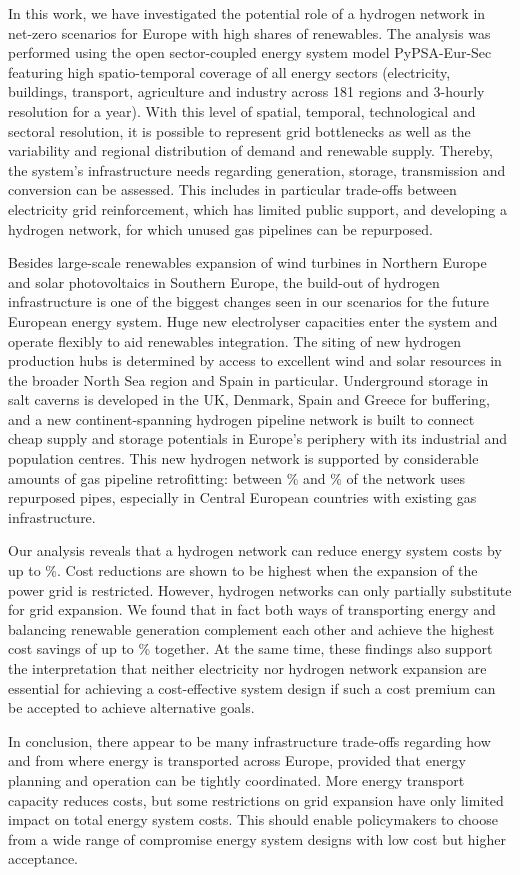In this work, we have investigated the potential role of a hydrogen network in
net-zero \co scenarios for Europe with high shares of renewables. The analysis
was performed using the open sector-coupled energy system model PyPSA-Eur-Sec
featuring high spatio-temporal coverage of all energy sectors (electricity,
buildings, transport, agriculture and industry across 181 regions and 3-hourly
resolution for a year). With this level of spatial, temporal, technological and
sectoral resolution, it is possible to represent grid bottlenecks as well as the
variability and regional distribution of demand and renewable supply. Thereby,
the system's infrastructure needs regarding generation, storage, transmission
and conversion can be assessed. This includes in particular trade-offs between
electricity grid reinforcement, which has limited public support, and developing
a hydrogen network, for which unused gas pipelines can be
repurposed.

Besides large-scale renewables expansion of wind turbines in Northern Europe and
solar photovoltaics in Southern Europe, the build-out of hydrogen infrastructure
is one of the biggest changes seen in our scenarios for the future European
energy system. Huge new electrolyser capacities enter the system and operate
flexibly to aid renewables integration. The siting of new hydrogen production
hubs is determined by access to excellent wind and solar resources in the
broader North Sea region and Spain in particular. Underground storage in salt
caverns is developed in the UK, Denmark, Spain and Greece for buffering, and a
new continent-spanning hydrogen pipeline network is built to connect cheap
supply and storage potentials in Europe's periphery with its industrial and
population centres. This new hydrogen network is supported by considerable
amounts of gas pipeline retrofitting: between \minretroshare\% and
\maxretroshare\% of the network uses repurposed pipes, especially in Central
European countries with existing gas infrastructure.

Our analysis reveals that a hydrogen network can reduce energy system costs by
up to \maxhybenefitrel\%. Cost reductions are shown to be highest when the
expansion of the power grid is restricted. However, hydrogen networks can only
partially substitute for grid expansion. We found that in fact both ways of
transporting energy and balancing renewable generation complement each other and
achieve the highest cost savings of up to \gridbenefitrel\% together. At the
same time, these findings also support the interpretation that neither
electricity nor hydrogen network expansion are essential for achieving a
cost-effective system design if such a cost premium can be accepted to achieve
alternative goals.

In conclusion, there appear to be many infrastructure trade-offs regarding how
and from where energy is transported across Europe, provided that energy
planning and operation can be tightly coordinated. More energy transport
capacity reduces costs, but some restrictions on grid expansion have only
limited impact on total energy system costs. This should enable policymakers to
choose from a wide range of compromise energy system designs with low cost but
higher acceptance.